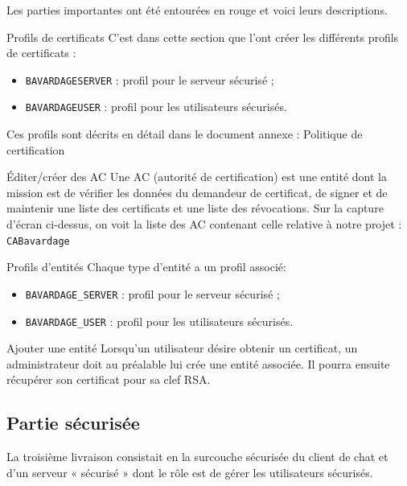 \documentclass[a4paper,11pt,french]{book}
\begin{document}
Les parties importantes ont été entourées en rouge et voici leurs descriptions.

\begin{paragraph}{Profils de certificats}
C'est dans cette section que l'ont créer les différents profils de certificats :
\begin{itemize}
\item \verb+BAVARDAGESERVER+ : profil pour le serveur sécurisé ;
\item \verb+BAVARDAGEUSER+ : profil pour les utilisateurs sécurisés.
\end{itemize}

Ces profils sont décrits en détail dans le document annexe : Politique de certification
\end{paragraph}

\begin{paragraph}{Éditer/créer des AC}
Une AC (autorité de certification) est une entité dont la mission est de vérifier les données du demandeur de certificat, de signer et de maintenir une liste des certificats et une liste des révocations. Sur la capture d'écran ci-dessus, on voit la liste des AC contenant celle relative à notre projet : \verb+CABavardage+
\end{paragraph}


\begin{paragraph}{Profils d'entités}
Chaque type d'entité a un profil associé:
\begin{itemize}
\item \verb+BAVARDAGE_SERVER+ : profil pour le serveur sécurisé ;
\item \verb+BAVARDAGE_USER+ : profil pour les utilisateurs sécurisés.
\end{itemize}
\end{paragraph}


\begin{paragraph}{Ajouter une entité}
Lorsqu'un utilisateur désire obtenir un certificat, un administrateur doit au préalable lui crée une entité associée. Il pourra ensuite récupérer son certificat pour sa clef RSA.
\end{paragraph}


\subsection{Partie sécurisée}
La troisième livraison consistait en la surcouche sécurisée du client de chat et d'un serveur « sécurisé » dont le rôle est de gérer les utilisateurs sécurisés.
\end{document}
